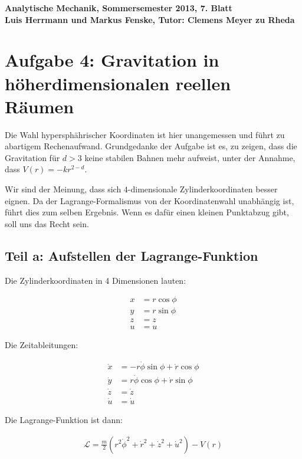 \documentclass[a4paper,german,12pt,smallheadings]{scrartcl}
\begin{document}
\begin{center}
\bfseries %
\sffamily %
\vspace{-40pt}
Analytische Mechanik, Sommersemester 2013, 7. Blatt \\
Luis Herrmann und Markus Fenske, Tutor: Clemens Meyer zu Rheda
\vspace{-10pt}
\end{center}
\section*{Aufgabe 4: Gravitation in höherdimensionalen reellen Räumen}

Die Wahl hypersphährischer Koordinaten ist hier unangemessen und führt zu
abartigem Rechenaufwand. Grundgedanke der Aufgabe ist es, zu zeigen, dass die
Gravitation für $d > 3$ keine stabilen Bahnen mehr aufweist, unter der Annahme,
dass $V(r) = -kr^{2-d}$.

Wir sind der Meinung, dass sich $4$-dimensionale Zylinderkoordinaten besser
eignen. Da der Lagrange-Formalismus von der Koordinatenwahl unabhängig ist,
führt dies zum selben Ergebnis. Wenn es dafür einen kleinen Punktabzug gibt,
soll uns das Recht sein.

\subsection*{Teil a: Aufstellen der Lagrange-Funktion}

Die Zylinderkoordinaten in 4 Dimensionen lauten:

\begin{align*}
  x &= r \cos \phi \\
  y &= r \sin \phi \\
  z &= z \\
  u &= u
\end{align*}

Die Zeitableitungen:

\begin{align*}
  \dot{x} &= -r \dot{\phi} \sin \phi + \dot{r} \cos \phi\\
  \dot{y} &= r \dot{\phi} \cos \phi + \dot{r} \sin \phi\\
  \dot{z} &= \dot{z} \\
  \dot{u} &= \dot{u}
\end{align*}

Die Lagrange-Funktion ist dann:

\begin{align*}
  \mathcal{L} = \frac{m}{2}(r^2\dot{\phi}^2 + \dot{r}^2 + \dot{z}^2 + \dot{u}^2) - V(r)
\end{align*}
\end{document}
